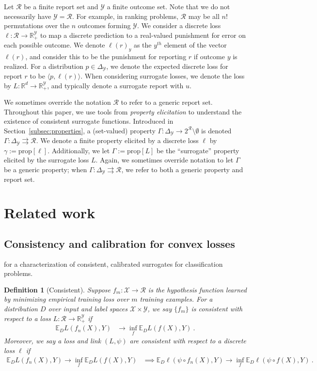 \documentclass{article}
\newcommand{\reals}{\mathbb{R}}
\newcommand{\simplex}{\Delta_\Y}
\newcommand{\prop}[1]{\mathrm{prop}[#1]}
\newcommand{\E}{\mathbb{E}}
\newcommand{\R}{\mathcal{R}}
\newcommand{\X}{\mathcal{X}}
\newcommand{\Y}{\mathcal{Y}}
\newcommand{\inprod}[2]{\langle #1, #2 \rangle}
\newcommand{\toto}{\rightrightarrows}
\newtheorem{definition}{Definition}
\begin{document}
Let $\R$ be a finite report set and $\Y$ a finite outcome set.
Note that we do not necessarily have $\Y = \R$.  
For example, in ranking problems, $\R$ may be all $n!$ permutations over the $n$ outcomes forming $\Y$.
We consider a discrete loss $\ell : \R \to \reals_+^\Y$ to map a discrete prediction to a real-valued punishment for error on each possible outcome.
We denote $\ell(r)_y$ as the $y^{th}$ element of the vector $\ell(r)$, and consider this to be the punishment for reporting $r$ if outcome $y$ is realized.
For a distribution $p \in \simplex$, we denote the expected discrete loss for report $r$ to be $\inprod{p}{\ell(r)}$.
When considering surrogate losses, we denote the loss by $L : \reals^d \to \reals_+^\Y$, and typically denote a surrogate report with $u$.

We sometimes override the notation $\R$ to refer to a generic report set.
Throughout this paper, we use tools from \emph{property elicitation} to understand the existence of consistent surrogate functions.
Introduced in Section~\ref{subsec:properties}, a (set-valued) property $\Gamma: \simplex \to 2^\R \setminus \emptyset$ is denoted $\Gamma:\simplex \toto \R$.
We denote a finite property elicited by a discrete loss $\ell$ by $\gamma := \prop{\ell}$.
Additionally, we let $\Gamma := \prop{L}$ be the ``surrogate'' property elicited by the surrogate loss $L$.
Again, we sometimes override notation to let $\Gamma$ be a generic property; when $\Gamma: \simplex \toto \R$, we refer to both a generic property and report set.

\section{Related work}\label{sec:related-work}
\subsection{Consistency and calibration for convex losses}\label{subsec:convex-surrogates}
\cite{bartlett2006convexity,tewari2007consistency} for a characterization of consistent, calibrated surrogates for classification problems.

\begin{definition}[Consistent]
	Suppose $f_m : \X \to \R$ is the hypothesis function learned by minimizing empirical training loss over $m$ training examples.
	For a distribution $D$ over input and label spaces $\X \times\Y$, we say $\{f_m\}$ is \emph{consistent} with respect to a loss $L: \R \to \reals^\Y_+$ if
	\begin{align*}
	\E_D L(f_n(X), Y) &\to \inf_f \E_D L(f(X), Y)~.~
	\end{align*}
	Moreover, we say a loss and link $(L,\psi)$ are consistent with respect to a discrete loss $\ell$ if 
	\begin{align*}
		\E_D L(f_n(X), Y) \to \inf_f \E_D L(f(X), Y) &\implies \E_D \ell(\psi \circ f_n(X), Y) \to \inf_f \E_D \ell(\psi \circ f(X), Y)~.~
	\end{align*}
\end{definition}
\end{document}
